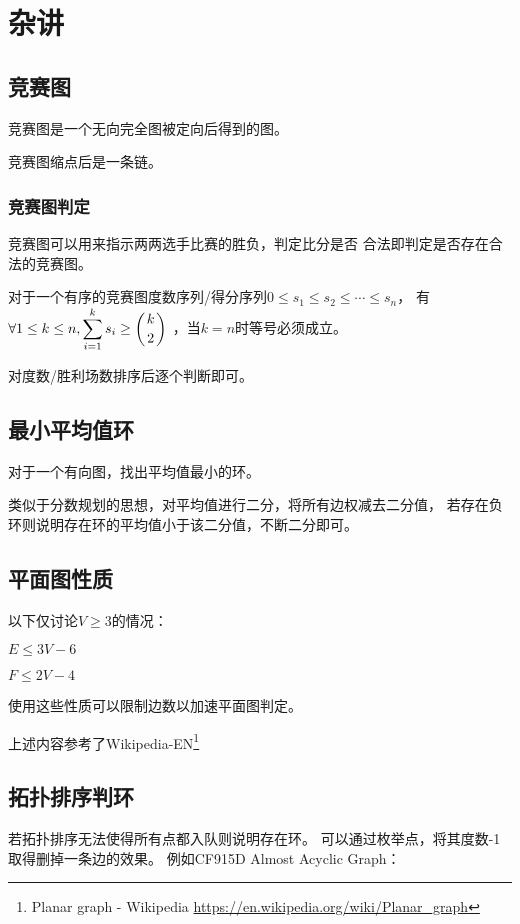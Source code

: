 \section{杂讲}
\subsection{竞赛图}
竞赛图是一个无向完全图被定向后得到的图。
\begin{theorem}
    竞赛图缩点后是一条链。
\end{theorem}
\subsubsection{竞赛图判定}
竞赛图可以用来指示两两选手比赛的胜负，判定比分是否
合法即判定是否存在合法的竞赛图。
\begin{theorem}
对于一个有序的竞赛图度数序列/得分序列$0\leq s_1 \leq s_2 \leq \cdots \leq s_n$，
有$\displaystyle \forall 1\leq k\leq n,\sum_{i=1}^k{s_i}\geq \left(k \atop 2\right)$
，当$k=n$时等号必须成立。
\end{theorem}
对度数/胜利场数排序后逐个判断即可。
\subsection{最小平均值环}
对于一个有向图，找出平均值最小的环。

类似于分数规划的思想，对平均值进行二分，将所有边权减去二分值，
若存在负环则说明存在环的平均值小于该二分值，不断二分即可。
\subsection{平面图性质}
以下仅讨论$V\geq 3$的情况：
\begin{property}
    $E\leq 3V-6$
\end{property}
\begin{property}
    $F\leq 2V-4$
\end{property}
使用这些性质可以限制边数以加速平面图判定。

上述内容参考了Wikipedia-EN\footnote{Planar graph - Wikipedia
    \url{https://en.wikipedia.org/wiki/Planar\_graph}
}
\subsection{拓扑排序判环}
若拓扑排序无法使得所有点都入队则说明存在环。
可以通过枚举点，将其度数-1取得删掉一条边的效果。
例如CF915D Almost Acyclic Graph：


